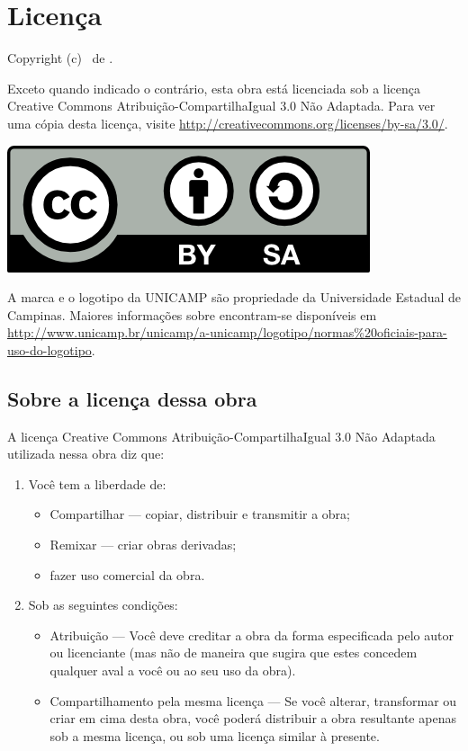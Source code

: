 \chapter{Licença}
Copyright (c) \ano \ de \autor.

Exceto quando indicado o contrário, esta obra está licenciada sob a licença
Creative Commons Atribuição-CompartilhaIgual 3.0 Não Adaptada. Para ver uma
cópia desta licença, visite
\url{http://creativecommons.org/licenses/by-sa/3.0/}.

\begin{center}
  \includegraphics{figuras/cc-by-sa.png}
\end{center}


A marca e o logotipo da UNICAMP são propriedade da Universidade Estadual de
Campinas. Maiores informações sobre encontram-se disponíveis em
\url{http://www.unicamp.br/unicamp/a-unicamp/logotipo/normas%20oficiais-para-uso-do-logotipo}.

\section{Sobre a licença dessa obra}
A licença Creative Commons Atribuição-CompartilhaIgual 3.0 Não Adaptada
utilizada nessa obra diz que:
\begin{enumerate}
  \item Você tem a liberdade de:
    \begin{itemize}
      \item Compartilhar — copiar, distribuir e transmitir a obra;
      \item Remixar — criar obras derivadas;
      \item fazer uso comercial da obra.
    \end{itemize}
  \item Sob as seguintes condições:
    \begin{itemize}
      \item Atribuição — Você deve creditar a obra da forma especificada pelo
        autor ou licenciante (mas não de maneira que sugira que estes concedem
        qualquer aval a você ou ao seu uso da obra).
      \item Compartilhamento pela mesma licença — Se você alterar, transformar
        ou criar em cima desta obra, você poderá distribuir a obra resultante
        apenas sob a mesma licença, ou sob uma licença similar à presente.
    \end{itemize}
\end{enumerate}
